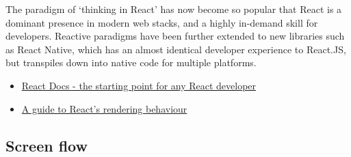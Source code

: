 The paradigm of `thinking in React' has now become so popular that React is a dominant presence in modern web stacks, and a highly in-demand skill for developers. Reactive paradigms have been further extended to new libraries such as React Native, which has an almost identical developer experience to React.JS, but transpiles down into native code for multiple platforms.

\begin{itemize}
    \item \href{https://reactjs.org/docs/hello-world.html}{React Docs - the starting point for any React developer}
    \item \href{https://blog.isquaredsoftware.com/2020/05/blogged-answers-a-mostly-complete-guide-to-react-rendering-behavior/#rendering-process-overview}{A guide to React's rendering behaviour}
\end{itemize}

\subsection{Screen flow}